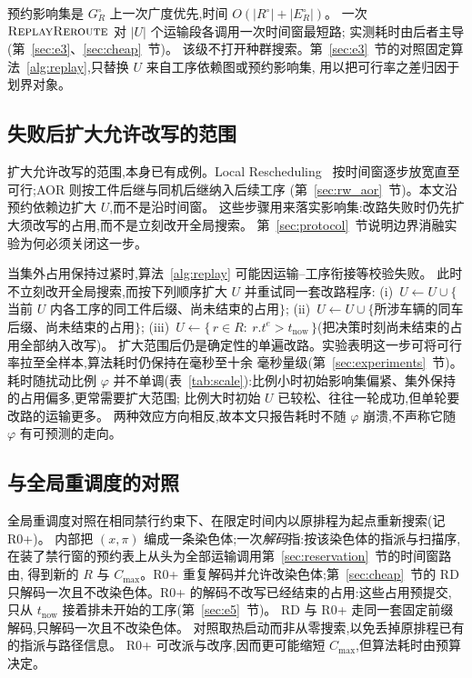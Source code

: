 \documentclass[manuscript,screen,review]{acmart}
\begin{document}
预约影响集是 \(G_R^\circ\) 上一次广度优先,时间 \(O(|R^{\circ}|+|E_R^{\circ}|)\)。
一次 \(\textsc{ReplayReroute}\) 对 \(|U|\) 个运输段各调用一次时间窗最短路;
实测耗时由后者主导(第~\ref{sec:e3}、\ref{sec:cheap}~节)。
该级不打开种群搜索。第~\ref{sec:e3}~节的对照固定算法~\ref{alg:replay},只替换 \(U\) 来自工序依赖图或预约影响集,
用以把可行率之差归因于划界对象。

\subsection{失败后扩大允许改写的范围}
\label{sec:scope_escalation}

扩大允许改写的范围,本身已有成例。Local Rescheduling~\cite{kuster2007local}
按时间窗逐步放宽直至可行;AOR 则按工件后继与同机后继纳入后续工序
(第~\ref{sec:rw_aor}~节)。本文沿预约依赖边扩大 \(U\),而不是沿时间窗。
这些步骤用来落实影响集:改路失败时仍先扩大须改写的占用,而不是立刻改开全局搜索。
第~\ref{sec:protocol}~节说明边界消融实验为何必须关闭这一步。

当集外占用保持过紧时,算法~\ref{alg:replay} 可能因运输--工序衔接等校验失败。
此时不立刻改开全局搜索,而按下列顺序扩大 \(U\) 并重试同一套改路程序:
(i)~\(U\leftarrow U\cup\{\)当前 \(U\) 内各工序的同工件后缀、尚未结束的占用\(\}\);
(ii)~\(U\leftarrow U\cup\{\)所涉车辆的同车后缀、尚未结束的占用\(\}\);
(iii)~\(U\leftarrow\{\,r\in R:\ r.t^e>t_{\mathrm{now}}\,\}\)(把决策时刻尚未结束的占用全部纳入改写)。
扩大范围后仍是确定性的单遍改路。实验表明这一步可将可行率拉至全样本,算法耗时仍保持在毫秒至十余
毫秒量级(第~\ref{sec:experiments}~节)。耗时随扰动比例 \(\varphi\)
并不单调(表~\ref{tab:scale}):比例小时初始影响集偏紧、集外保持的占用偏多,更常需要扩大范围;
比例大时初始 \(U\) 已较松、往往一轮成功,但单轮要改路的运输更多。
两种效应方向相反,故本文只报告耗时不随 \(\varphi\) 崩溃,不声称它随 \(\varphi\) 有可预测的走向。

\subsection{与全局重调度的对照}
\label{sec:vs_r0}

全局重调度对照在相同禁行约束下、在限定时间内以原排程为起点重新搜索(记 R0+)。
内部把 \((x,\pi)\) 编成一条染色体;一次\emph{解码}指:按该染色体的指派与扫描序,
在装了禁行窗的预约表上从头为全部运输调用第~\ref{sec:reservation}~节的时间窗路由,
得到新的 \(R\) 与 \(C_{\max}\)。R0+ 重复解码并允许改染色体;第~\ref{sec:cheap}~节的
RD 只解码一次且不改染色体。R0+ 的解码不改写已经结束的占用:这些占用预提交,
只从 \(t_{\mathrm{now}}\) 接着排未开始的工序(第~\ref{sec:e5}~节)。
RD 与 R0+ 走同一套固定前缀解码,只解码一次且不改染色体。
对照取热启动而非从零搜索,以免丢掉原排程已有的指派与路径信息。
R0+ 可改派与改序,因而更可能缩短 \(C_{\max}\),但算法耗时由预算决定。
\end{document}

